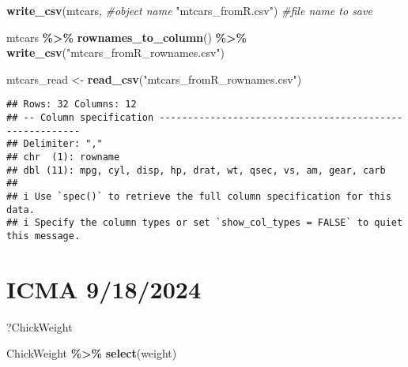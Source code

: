 \documentclass[
]{article}
\newenvironment{Shaded}{\begin{snugshade}}{\end{snugshade}}
\newcommand{\CommentTok}[1]{\textcolor[rgb]{0.56,0.35,0.01}{\textit{#1}}}
\newcommand{\FunctionTok}[1]{\textcolor[rgb]{0.13,0.29,0.53}{\textbf{#1}}}
\newcommand{\NormalTok}[1]{#1}
\newcommand{\OtherTok}[1]{\textcolor[rgb]{0.56,0.35,0.01}{#1}}
\newcommand{\SpecialCharTok}[1]{\textcolor[rgb]{0.81,0.36,0.00}{\textbf{#1}}}
\newcommand{\StringTok}[1]{\textcolor[rgb]{0.31,0.60,0.02}{#1}}
\begin{document}
\begin{Shaded}
\begin{Highlighting}[]
\FunctionTok{write\_csv}\NormalTok{(mtcars, }\CommentTok{\#object name}
          \StringTok{"mtcars\_fromR.csv"}\NormalTok{) }\CommentTok{\#file name to save}
\end{Highlighting}
\end{Shaded}

\begin{Shaded}
\begin{Highlighting}[]
\NormalTok{mtcars }\SpecialCharTok{\%\textgreater{}\%}
  \FunctionTok{rownames\_to\_column}\NormalTok{() }\SpecialCharTok{\%\textgreater{}\%}
  \FunctionTok{write\_csv}\NormalTok{(}\StringTok{"mtcars\_fromR\_rownames.csv"}\NormalTok{)}
\end{Highlighting}
\end{Shaded}

\begin{Shaded}
\begin{Highlighting}[]
\NormalTok{mtcars\_read }\OtherTok{\textless{}{-}} \FunctionTok{read\_csv}\NormalTok{(}\StringTok{"mtcars\_fromR\_rownames.csv"}\NormalTok{)}
\end{Highlighting}
\end{Shaded}

\begin{verbatim}
## Rows: 32 Columns: 12
## -- Column specification --------------------------------------------------------
## Delimiter: ","
## chr  (1): rowname
## dbl (11): mpg, cyl, disp, hp, drat, wt, qsec, vs, am, gear, carb
## 
## i Use `spec()` to retrieve the full column specification for this data.
## i Specify the column types or set `show_col_types = FALSE` to quiet this message.
\end{verbatim}

\section{ICMA 9/18/2024}\label{icma-9182024}

\begin{Shaded}
\begin{Highlighting}[]
\NormalTok{?ChickWeight}
\end{Highlighting}
\end{Shaded}

\begin{Shaded}
\begin{Highlighting}[]
\NormalTok{ChickWeight }\SpecialCharTok{\%\textgreater{}\%}
  \FunctionTok{select}\NormalTok{(weight)}
\end{Highlighting}
\end{Shaded}
\end{document}
